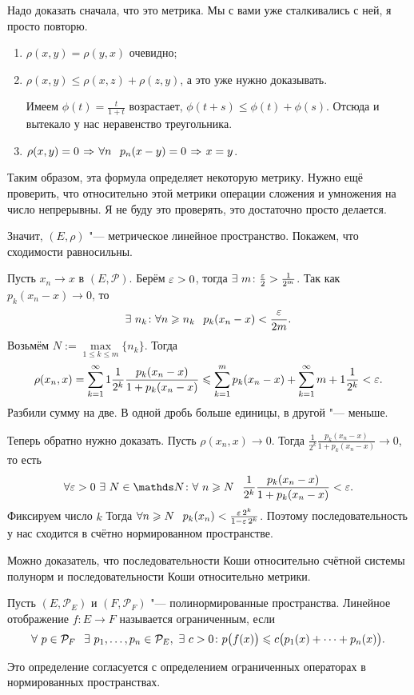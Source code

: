 \begin{Proof}
  Надо доказать сначала, что это метрика. Мы с вами уже сталкивались с ней, я просто повторю.
\begin{enumerate}
\item $\rho(x,y) = \rho(y,x)$ очевидно;
\item $\rho(x,y)\le\rho(x,z) + \rho(z,y)$, а это уже нужно доказывать.

Имеем $\phi(t) = \frac t{1+t}$ возрастает, $\phi(t+s)\le \phi(t) + \phi(s)$. Отсюда и вытекало у нас неравенство треугольника.

\item $\rho(x,y)=0\imp \forall n\pau p_n(x-y)=0\imp x=y$.
\end{enumerate}
Таким образом, эта формула определяет некоторую метрику. Нужно ещё проверить, что относительно этой метрики операции сложения и умножения на число непрерывны. Я не буду это проверять, это достаточно просто делается.

Значит, $(E,\rho)$ "--- метрическое линейное пространство. Покажем, что сходимости равносильны.

Пусть $x_n\to x$ в $(E,\mathcal P)$. Берём $\varepsilon>0$, тогда $\exists\ m\colon \frac{\varepsilon}2 >\frac1{2^m}$. Так как $p_k(x_n-x)\to0$, то 
\[\exists\ n_k\colon \forall n\ge n_k\pau  p_k(x_n-x)<\frac\e{2m}.
\]
Возьмём $N:=\max\limits_{1\le k\le m}\{n_k\}$. Тогда
\[
  \rho(x_n,x) = \sum\limits_{{k}={1}}^\infty1\frac1{2^k}\frac{p_k(x_n-x)}{1+p_k(x_n-x)}\leqslant
  \sum\limits_{k = 1}^{m}p_k(x_n-x) + \sum\limits_{{k}={1}}^\infty{m+1}\frac1{2^k} < \varepsilon.
\]
Разбили сумму на две. В одной дробь больше единицы, в другой "--- меньше.

Теперь обратно нужно доказать. Пусть $\rho(x_n,x)\to0$. Тогда 
$\frac1{2^k}\frac{p_k(x_n-x)}{1+p_k(x_n-x)}\to0$, то есть
\[
  \forall \e>0\ \exists\ N\in\N\colon \forall\ n\ge N\pau
  \frac1{2^k}\frac{p_k(x_n-x)}{1+p_k(x_n-x)}<\e.
\]
Фиксируем число $k$ Тогда $\forall n\ge N\pau p_k(x_n) <\frac{\e\,2^k}{1-\e\,2^k}$. Поэтому последовательность у нас сходится в счётно нормированном пространстве.

\end{Proof}
Можно доказатель, что последовательности Коши относительно счётной системы полунорм и последовательности Коши относительно метрики.

\begin{Def}
Пусть $(E,\mathcal P_E)$ и $(F,\mathcal P_F)$ "--- полинормированные пространства. Линейное отображение $f\colon E\to F$ называется ограниченным, если
\[
  \forall\ p\in\mathcal P_F\pau \exists\ p_1,\dots,p_n\in\mathcal P_E,\ \exists\ c>0\colon 
  p\big(f(x)\big)\le c\big(p_1(x) + \dots + p_n(x)\big).
\]
\end{Def}
Это определение согласуется с определением ограниченных операторах в нормированных пространствах.

